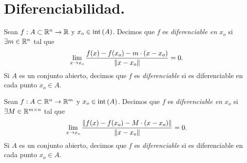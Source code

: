 \documentclass[a4paper]{scrartcl} %
\begin{document}
\section{Diferenciabilidad.} \label{sec:diferenciabilidad}

\begin{definition} \label{def:dif_escalar}
\mbox{}
Sean $f: A \subset \mathbb{R}^n \to \mathbb{R}$ y $x_o \in \operatorname{int}{(A)}$. Decimos que $f$ es \emph{diferenciable en $x_o$} si $\exists m \in \mathbb{R}^n$ tal que
\[
  \lim_{x \to x_o} \frac{f(x) - f(x_o) - m \cdot (x - x_o)}{\norm{x - x_o}} = 0.
\]
Si $A$ es un conjunto abierto, decimos que $f$ es \emph{diferenciable} si es diferenciable en cada punto $x_o \in A$.
\end{definition}

\begin{definition} \label{def:dif_general}
\mbox{}

Sean $f: A \subset \mathbb{R}^n \to \mathbb{R}^m$ y $x_o \in \operatorname{int}{(A)}$. Decimos que $f$ es \emph{diferenciable en $x_o$} si $\exists M \in \mathbb{R}^{m \times n}$ tal que
\[
  \lim_{x \to x_o} \frac{\norm{f(x) - f(x_o) - M \cdot (x - x_o)}}{\norm{x - x_o}} = 0.
\]
Si $A$ es un conjunto abierto, decimos que $f$ es \emph{diferenciable} si es diferenciable en cada punto $x_o \in A$.
\end{definition}
\end{document}
